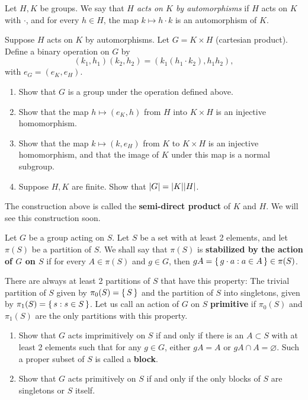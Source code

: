 \documentclass[./main.tex]{subfiles}
\begin{document}
\begin{exercise}
\label{exercise:semidirect-products}
    Let $H, K$ be groups. We say that \emph{$H$ acts on $K$ by automorphisms} if
    $H$ acts on $K$ with $\cdot$, and for every $h \in H$, the map $k \mapsto h
    \cdot k$ is an automorphism of $K$.

    Suppose $H$ acts on $K$ by automorphisms. Let $G = K \times H$ (cartesian
    product). Define a binary operation on $G$ by
    \[
        (k_1, h_1) (k_2, h_2) = (k_1 (h_1 \cdot k_2), h_1 h_2),
    \]
    with $e_G = (e_K,e_H)$. 

    \begin{enumerate}[label=(\roman*)]
        \item Show that $G$ is a group under the operation defined above.
        \item Show that the map $h \mapsto (e_K, h)$ from $H$ into $K \times H$ is an injective homomorphism.
        \item Show that the map $k \mapsto (k, e_H)$ from $K$ to $K \times H$ is
        an injective homomorphism, and that the image of $K$ under this map is a
        normal subgroup.
        \item Suppose $H, K$ are finite. Show that $\abs G = \abs K \abs H$.
    \end{enumerate}

    The construction above is called the \textbf{semi-direct product} of $K$ and
    $H$. We will see this construction soon.
\end{exercise}

\begin{exercise}
Let $G$ be a group acting on $S$. Let $S$ be a set with at least 2 elements, and
let $\pi(S)$ be a partition of $S$. We shall say that $\pi(S)$ is
\textbf{stabilized by the action of $G$ on $S$} if for every $A \in \pi(S)$ and
$g \in G$, then $gA = \set{g \cdot a: a \in A} \in \pi(S)$. 

There are always at least 2 partitions of $S$ that have this property: The
trivial partition of $S$ given by $\pi_0(S) = \set{S}$ and the partition of $S$
into singletons, given by $\pi_1(S) = \set{{s}: s \in S}$. Let us call an action
of $G$ on $S$ \textbf{primitive} if $\pi_0(S)$ and $\pi_1(S)$ are the only
partitions with this property. 

\begin{enumerate}[label=(\roman*)]
    \item Show that $G$ acts imprimitively on $S$ if and only if there is an $A
    \subset S$ with at least 2 elements such that for any $g \in G$, either $gA
    = A$ or $gA \cap A = \varnothing$. Such a proper subset of $S$ is called a
    \textbf{block}.

    \item Show that $G$ acts primitively on $S$ if and only if the only blocks
    of $S$ are singletons or $S$ itself.
    
\end{enumerate}
    
\end{exercise}
\end{document}
